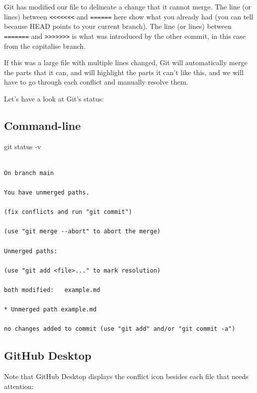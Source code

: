 \documentclass[
  letterpaper,
  DIV=11,
  numbers=noendperiod]{scrartcl}
\newenvironment{Shaded}{\begin{snugshade}}{\end{snugshade}}
\newcommand{\AttributeTok}[1]{\textcolor[rgb]{0.40,0.45,0.13}{#1}}
\newcommand{\FunctionTok}[1]{\textcolor[rgb]{0.28,0.35,0.67}{#1}}
\newcommand{\NormalTok}[1]{\textcolor[rgb]{0.00,0.23,0.31}{#1}}
\begin{document}
Git has modified our file to delineate a change that it cannot merge.
The line (or lines) between
\texttt{\textless{}\textless{}\textless{}\textless{}\textless{}\textless{}\textless{}}
and \texttt{======} here show what you already had (you can tell because
HEAD points to your current branch). The line (or lines) between
\texttt{=======} and
\texttt{\textgreater{}\textgreater{}\textgreater{}\textgreater{}\textgreater{}\textgreater{}\textgreater{}}
is what was introduced by the other commit, in this case from the
capitalise branch.

If this was a large file with multiple lines changed, Git will
automatically merge the parts that it can, and will highlight the parts
it can't like this, and we will have to go through each conflict and
manually resolve them.

Let's have a look at Git's status:

\subsection{Command-line}

\begin{Shaded}
\begin{Highlighting}[]

\FunctionTok{git}\NormalTok{ status }\AttributeTok{{-}v}
\end{Highlighting}
\end{Shaded}

\begin{verbatim}

On branch main

You have unmerged paths.

(fix conflicts and run "git commit")

(use "git merge --abort" to abort the merge)

Unmerged paths:

(use "git add <file>..." to mark resolution)

both modified:   example.md

* Unmerged path example.md

no changes added to commit (use "git add" and/or "git commit -a")
\end{verbatim}

\subsection{GitHub Desktop}

Note that GitHub Desktop displays the conflict icon besides each file
that needs attention:
\end{document}
